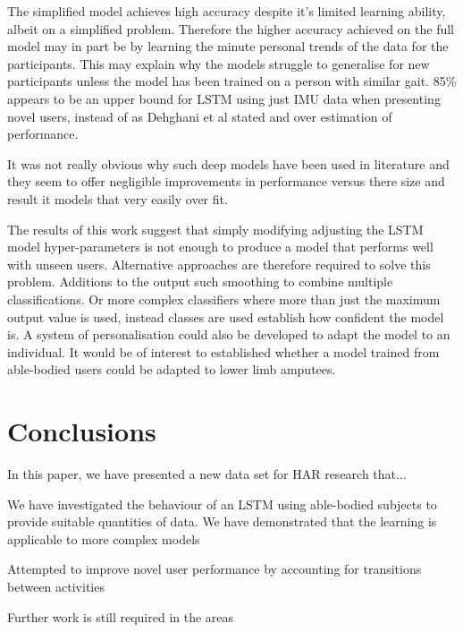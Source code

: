 \documentclass[sensors,article,submit,moreauthors,pdftex]{Definitions/mdpi}
\begin{document}
The simplified model achieves high accuracy despite it's limited learning ability, albeit on a simplified problem. Therefore the higher accuracy achieved on the full model may in part be by learning the minute personal trends of the data for the participants. This may explain why the models struggle to generalise for new participants unless the model has been trained on a person with similar gait. 85\% appears to be an upper bound for LSTM using just IMU data when presenting novel users, instead of as Dehghani et al stated and over estimation of performance.

It was not really obvious why such deep models have been used in literature and they seem to offer negligible improvements in performance versus there size and result it models that very easily over fit.

The results of this work suggest that simply modifying adjusting the LSTM model hyper-parameters is not enough to produce a model that performs well with unseen users. Alternative approaches are therefore required to solve this problem. Additions to the output such smoothing to combine multiple classifications. Or more complex classifiers where more than just the maximum output value is used, instead classes are used establish how confident the model is. A system of personalisation could also be developed to adapt the model to an individual. It would be of interest to established whether a model trained from able-bodied users could be adapted to lower limb amputees.

\section{Conclusions}%
In this paper, we have presented a new data set for HAR research that...

We have investigated the behaviour of an LSTM using able-bodied subjects to provide suitable quantities of data. We have demonstrated that the learning is applicable to more complex models

Attempted to improve novel user performance by accounting for transitions between activities

Further work is still required in the areas

\vspace{6pt} 
\end{document}
